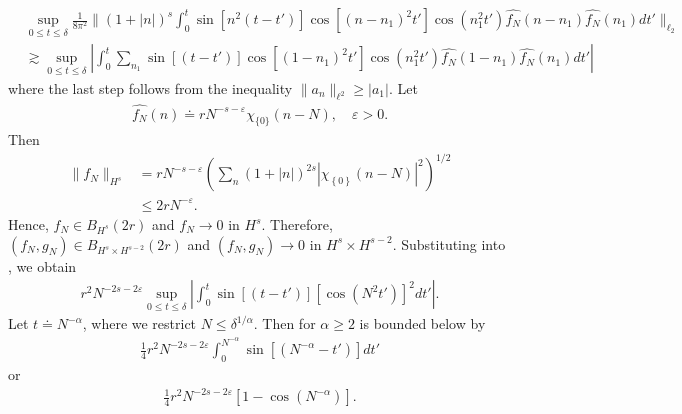 \documentclass[12pt,reqno]{amsart}
\numberwithin{equation}{section}  %
\renewcommand{\cref}{\Cref}
\newcommand{\wh}{\widehat}
\newcommand{\ee}{\varepsilon}
\begin{document}
%
%
\begin{equation}
  \label{yut}
\begin{split}
& \sup_{0 \le t \le \delta} \frac{1}{8 \pi^{2}}\| (1 + | n |)^{s}
\int_{0}^{t} \sin[n^{2}(t-t')] \cos[(n - n_{1})^{2}t']
\cos(n_{1}^{2}t') \wh{f_{N}}(n - n_{1})\wh{f_{N}}(n_{1}) dt'
\|_{\ell_{2}}
\\
& \gtrsim \sup_{0 \le t \le \delta} 
| \int_{0}^{t} \sum_{n_{1}} \sin[(t-t')] \cos[(1 -n_{1})^{2}t']
\cos(n_{1}^{2}t') \wh{f_{N}}(1 - n_{1})\wh{f_{N}}(n_{1}) dt' |
\end{split}
\end{equation}
%
%
%
%
%
%
%
%
%
where the last step follows from the inequality $\| a_{n} \|_{\ell^{2}} \ge
|a_{1}|$. Let
%
%
\begin{equation}
  \label{ill-pos-ce}
\begin{split}
  \wh{f_{N}}(n) \doteq r N^{-s - \ee} \chi_{\{{0}\}} (n - N), \quad \ee > 0.
\end{split}
\end{equation}
%
%
Then
%
%
\begin{equation*}
\begin{split}
  \| f_{N} \|_{H^{s}}
  & = rN^{-s -\ee} \left( \sum_{n} (1 + | n |)^{2s} |
  \chi_{\left\{0 \right\}} (n - N) |^{2} \right)^{1/2}
  \\
  & \le 2rN^{-\ee}.
\end{split}
\end{equation*}
%
%
Hence, $f_{N} \in B_{H^{s}}(2r)$ and $f_{N} \to 0$ in $H^{s}$. Therefore,
$(f_{N}, g_{N}) \in B_{H^{s} \times H^{s-2}}(2r)$ and $(f_{N}, g_{N}) \to 0$ in
$H^{s} \times H^{s-2}$. Substituting
\cref{ill-pos-ce} into \cref{yut}, we obtain
%
%
\begin{equation}
  \label{rxx}
\begin{split}
  r^{2}N^{-2s -2 \ee} \sup_{0 \le t \le \delta} 
  | \int_{0}^{t} \sin[(t-t')] [\cos(N^{2}t')]^{2} dt' |.
\end{split}
\end{equation}
%
Let $t \doteq N^{-\alpha}$, where we restrict $N \le
\delta^{1/\alpha}$. Then for $\alpha \ge 2$ \cref{rxx} is bounded below by
%
%
%
%
\begin{equation*}
\begin{split}
\frac{1}{4} r^{2}N^{-2s -2 \ee}  
\int_{0}^{N^{-\alpha}} \sin[(N^{-\alpha}-t')] dt'
\end{split}
\end{equation*}
%
%
or
%
%
\begin{equation*}
\begin{split}
\frac{1}{4} r^{2} N^{-2s -2 \ee}  
[1 - \cos(N^{-\alpha})].
\end{split}
\end{equation*}
\end{document}
